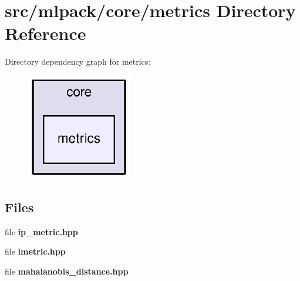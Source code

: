 \section{src/mlpack/core/metrics Directory Reference}
\label{dir_4efb564a11712fe6ab1802c27ccee872}
Directory dependency graph for metrics\+:
\nopagebreak
\begin{figure}[H]
\begin{center}
\leavevmode
\includegraphics[width=130pt]{dir_4efb564a11712fe6ab1802c27ccee872_dep}
\end{center}
\end{figure}
\subsection*{Files}
\begin{DoxyCompactItemize}
\item 
file {\bf ip\+\_\+metric.\+hpp}
\item 
file {\bf lmetric.\+hpp}
\item 
file {\bf mahalanobis\+\_\+distance.\+hpp}
\end{DoxyCompactItemize}
